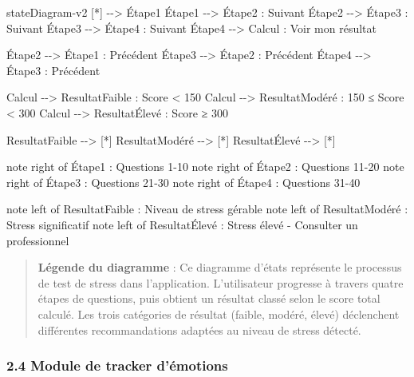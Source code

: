 \documentclass[
]{article}
\newenvironment{Shaded}{}{}
\newcommand{\NormalTok}[1]{#1}
\begin{document}
\begin{Shaded}
\begin{Highlighting}[]
\NormalTok{stateDiagram{-}v2}
\NormalTok{    [*] {-}{-}\textgreater{} Étape1}
\NormalTok{    Étape1 {-}{-}\textgreater{} Étape2 : Suivant}
\NormalTok{    Étape2 {-}{-}\textgreater{} Étape3 : Suivant}
\NormalTok{    Étape3 {-}{-}\textgreater{} Étape4 : Suivant}
\NormalTok{    Étape4 {-}{-}\textgreater{} Calcul : Voir mon résultat}
    
\NormalTok{    Étape2 {-}{-}\textgreater{} Étape1 : Précédent}
\NormalTok{    Étape3 {-}{-}\textgreater{} Étape2 : Précédent}
\NormalTok{    Étape4 {-}{-}\textgreater{} Étape3 : Précédent}
    
\NormalTok{    Calcul {-}{-}\textgreater{} ResultatFaible : Score \textless{} 150}
\NormalTok{    Calcul {-}{-}\textgreater{} ResultatModéré : 150 ≤ Score \textless{} 300}
\NormalTok{    Calcul {-}{-}\textgreater{} ResultatÉlevé : Score ≥ 300}
    
\NormalTok{    ResultatFaible {-}{-}\textgreater{} [*]}
\NormalTok{    ResultatModéré {-}{-}\textgreater{} [*]}
\NormalTok{    ResultatÉlevé {-}{-}\textgreater{} [*]}
    
\NormalTok{    note right of Étape1 : Questions 1{-}10}
\NormalTok{    note right of Étape2 : Questions 11{-}20}
\NormalTok{    note right of Étape3 : Questions 21{-}30}
\NormalTok{    note right of Étape4 : Questions 31{-}40}
    
\NormalTok{    note left of ResultatFaible : Niveau de stress gérable}
\NormalTok{    note left of ResultatModéré : Stress significatif}
\NormalTok{    note left of ResultatÉlevé : Stress élevé {-} Consulter un professionnel}
\end{Highlighting}
\end{Shaded}

\begin{quote}
\textbf{Légende du diagramme} : Ce diagramme d’états représente le
processus de test de stress dans l’application. L’utilisateur progresse
à travers quatre étapes de questions, puis obtient un résultat classé
selon le score total calculé. Les trois catégories de résultat (faible,
modéré, élevé) déclenchent différentes recommandations adaptées au
niveau de stress détecté.
\end{quote}

\subsubsection{2.4 Module de tracker
d’émotions}\label{module-de-tracker-duxe9motions}
\end{document}
